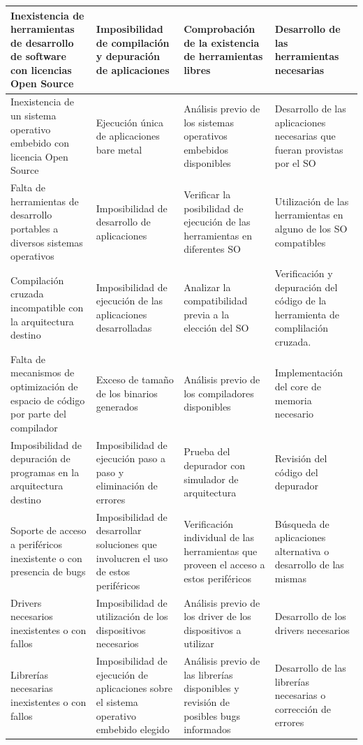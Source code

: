 \begin{table}[!h]
\begin{tabular}{ p{2.5cm} p{9cm} p{2cm} p{2cm} }
		\hline
		Inexistencia de herramientas de desarrollo de software con licencias Open Source & Imposibilidad de compilación y depuración de aplicaciones &Comprobación de la existencia de herramientas libres & Desarrollo de las herramientas necesarias\\
		\hline
		Inexistencia de un sistema operativo embebido con licencia Open Source  & Ejecución única de aplicaciones bare metal  & Análisis previo de los sistemas operativos embebidos disponibles & Desarrollo de las aplicaciones necesarias que fueran provistas por el SO\\
		\hline
		 Falta de herramientas de desarrollo portables a diversos sistemas operativos & Imposibilidad de desarrollo de aplicaciones& Verificar la posibilidad de ejecución de las herramientas en diferentes SO& Utilización de las herramientas en alguno de los SO compatibles\\
		\hline		
		 Compilación cruzada incompatible con la arquitectura destino& Imposibilidad de ejecución de las aplicaciones desarrolladas & Analizar la compatibilidad previa a la elección del SO &  Verificación y depuración del código de la herramienta de complilación cruzada. \\
		\hline
		Falta de mecanismos de optimización de espacio de código por parte del  compilador&Exceso de tamaño de los binarios generados & Análisis previo de los compiladores disponibles & Implementación del core de memoria necesario\\
		\hline
		Imposibilidad de depuración de programas en la arquitectura destino& Imposibilidad de ejecución paso a paso y eliminación de errores &Prueba del depurador con simulador de arquitectura & Revisión del código del depurador \\
		\hline
		Soporte de acceso a periféricos inexistente o con presencia de bugs & Imposibilidad de desarrollar soluciones que involucren el uso de estos periféricos & Verificación individual de las herramientas que proveen el acceso a estos periféricos & Búsqueda  de  aplicaciones alternativa o desarrollo de las mismas
 \\
		\hline
		 Drivers necesarios inexistentes o con fallos & Imposibilidad de utilización de los dispositivos necesarios&Análisis previo de los driver de los dispositivos a utilizar &  Desarrollo de los drivers necesarios\\
		\hline
		Librerías necesarias inexistentes o con fallos& Imposibilidad de ejecución de aplicaciones sobre el sistema operativo embebido elegido & Análisis previo de las librerías disponibles y revisión de posibles bugs informados &  Desarrollo de las librerías necesarias o corrección de errores\\

\end{tabular}
\end{table}
